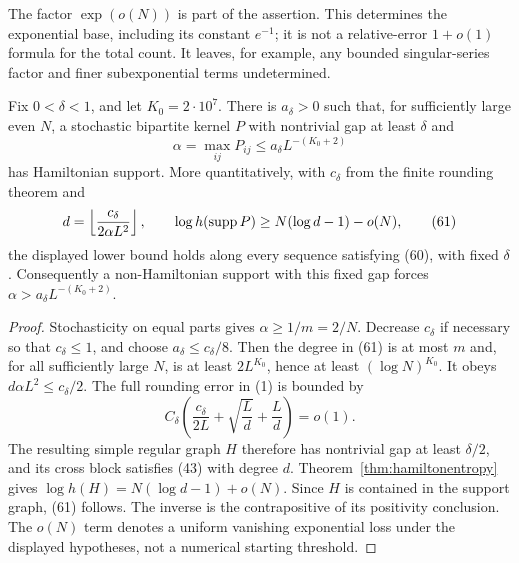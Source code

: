 \begin{remark}
The factor \(\exp(o(N))\) is part of the assertion.
This determines the exponential base, including its constant
\(e^{-1}\); it is not a relative-error \(1+o(1)\) formula for
the total count.
It leaves, for example, any bounded singular-series factor
and finer subexponential terms undetermined.
\end{remark}

\begin{corollary}
\label{cor:entropyinverse}
Fix \(0<\delta<1\), and let \(K_0=2\cdot10^7\).
There is \(a_\delta>0\) such that, for sufficiently large even
\(N\), a stochastic bipartite kernel \(P\) with nontrivial
gap at least \(\delta\) and
\[
 \alpha=\max_{ij}P_{ij}\leq a_\delta L^{-(K_0+2)}             \tag{60}
\]
has Hamiltonian support.
More quantitatively, with \(c_\delta\) from the finite
rounding theorem and
\[
 d=\left\lfloor\frac{c_\delta}{2\alpha L^2}\right\rfloor,
 \qquad
 \log h(\operatorname{supp} P)\geq N(\log d-1)-o(N),                       \tag{61}
\]
the displayed lower bound holds along every sequence
satisfying (60), with fixed \(\delta\).
Consequently a non-Hamiltonian support with this fixed gap
forces \(\alpha>a_\delta L^{-(K_0+2)}\).
\end{corollary}
\begin{proof}
Stochasticity on equal parts gives \(\alpha\geq1/m=2/N\).
Decrease \(c_\delta\) if necessary so that \(c_\delta\leq1\),
and choose \(a_\delta\leq c_\delta/8\).
Then the degree in (61) is at most \(m\) and, for all
sufficiently large \(N\), is at least
\(2L^{K_0}\), hence at least \((\log N)^{K_0}\).
It obeys \(d\alpha L^2\leq c_\delta/2\).
The full rounding error in (1) is bounded by
\[
 C_\delta\left(\frac{c_\delta}{2L}
       +\sqrt{\frac Ld}+\frac Ld\right)=o(1).
\]
The resulting simple regular graph \(H\) therefore has
nontrivial gap at least \(\delta/2\), and its cross block
satisfies (43) with degree \(d\).
Theorem~\ref{thm:hamiltonentropy} gives
\(\log h(H)=N(\log d-1)+o(N)\).
Since \(H\) is contained in the support graph, (61) follows.
The inverse is the contrapositive of its positivity conclusion.
The \(o(N)\) term denotes a uniform vanishing exponential
loss under the displayed hypotheses, not a numerical
starting threshold.
\end{proof}
